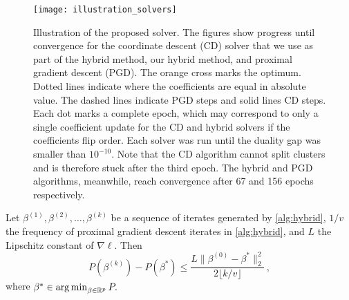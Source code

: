 \begin{figure*}[htb]
  \centering
  \texttt{[image: illustration\_solvers]}
  \caption{Illustration of the proposed solver. The figures show progress
    until convergence for the coordinate descent (CD) solver that we use as part
    of the hybrid method, our hybrid method, and  proximal gradient descent
    (PGD). The orange cross marks the optimum. Dotted lines indicate where the
    coefficients are equal in absolute value. The dashed lines indicate PGD
    steps and solid lines CD steps. Each dot marks a complete epoch, which may
    correspond to only a single coefficient update for the CD and hybrid
    solvers if the coefficients flip order. Each solver was run until the duality
    gap was smaller than \(10^{-10}\). Note that the CD algorithm cannot split clusters
    and is therefore stuck after the third epoch. The hybrid and PGD algorithms,
    meanwhile, reach convergence after 67 and 156 epochs respectively.}
  \label{fig:illustration-solver}
\end{figure*}

\begin{lemma}
  \label{lem:convergence}
  Let \(\beta^{(1)}, \beta^{(2)}, \dots, \beta^{(k)}\) be a sequence of
  iterates generated by \cref{alg:hybrid}, \(1/v\) the frequency of proximal gradient
  descent iterates in \cref{alg:hybrid}, and \(L\) the Lipschitz constant of
  \(\nabla \ell\). Then
  \[
    P(\beta^{(k)}) - P(\beta^*) \leq \frac{L \lVert \beta^{(0)} - \beta^* \rVert_2^2}{2\lfloor k/v \rfloor }\, ,
  \]
  where \(\beta^* \in \operatorname*{arg\,min}_{\beta \in \mathbb{R}^p} P.\)
\end{lemma}

